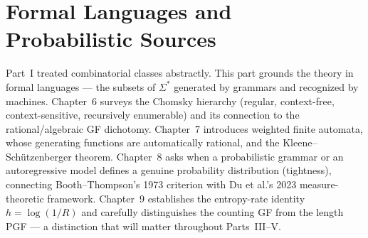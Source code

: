 \part{Formal Languages and Probabilistic Sources}

Part~I treated combinatorial classes abstractly. This part grounds the theory in formal languages --- the subsets of $\Sigma^*$ generated by grammars and recognized by machines. Chapter~6 surveys the Chomsky hierarchy (regular, context-free, context-sensitive, recursively enumerable) and its connection to the rational/algebraic GF dichotomy. Chapter~7 introduces weighted finite automata, whose generating functions are automatically rational, and the Kleene--Sch\"utzenberger theorem. Chapter~8 asks when a probabilistic grammar or an autoregressive model defines a genuine probability distribution (tightness), connecting Booth--Thompson's 1973 criterion with Du et al.'s 2023 measure-theoretic framework. Chapter~9 establishes the entropy-rate identity $h = \log(1/R)$ and carefully distinguishes the counting GF from the length PGF --- a distinction that will matter throughout Parts~III--V.






